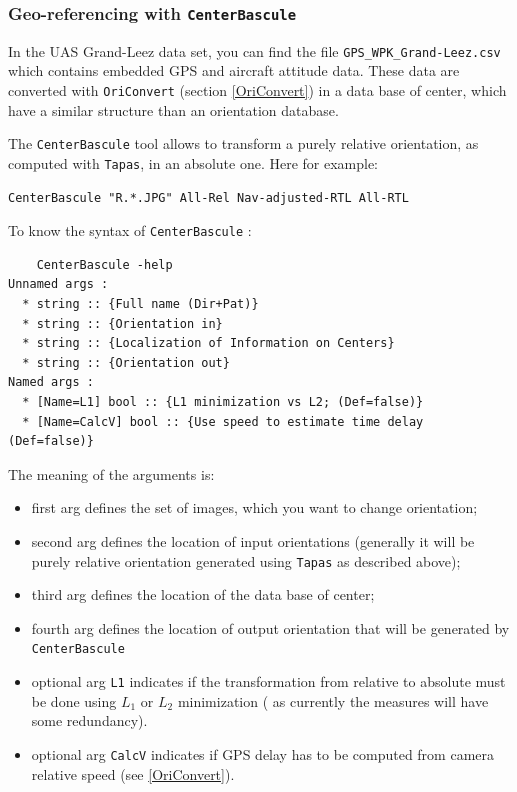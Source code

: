 

\subsubsection{Geo-referencing with {\tt CenterBascule}}\label{Sec:CenterBascule}


In the UAS Grand-Leez data set, you can find the file {\tt GPS\_WPK\_Grand-Leez.csv} which contains embedded GPS and aircraft attitude data. These data are converted with {\tt OriConvert} (section \ref{OriConvert}) in a data base of center, which have a similar structure than an orientation database.

The {\tt CenterBascule} tool allows to transform a purely relative orientation,
as computed with {\tt Tapas}, in an absolute one. Here for example:

\begin{verbatim}
CenterBascule "R.*.JPG" All-Rel Nav-adjusted-RTL All-RTL
\end{verbatim}

To know the syntax of {\tt CenterBascule} :
\begin{verbatim}
	CenterBascule -help
Unnamed args :
  * string :: {Full name (Dir+Pat)}
  * string :: {Orientation in}
  * string :: {Localization of Information on Centers}
  * string :: {Orientation out}
Named args :
  * [Name=L1] bool :: {L1 minimization vs L2; (Def=false)}
  * [Name=CalcV] bool :: {Use speed to estimate time delay (Def=false)}
\end{verbatim}

The meaning of the arguments is:

\begin{itemize}
  \item  first arg defines the set of images, which you want to change orientation;
  \item  second arg defines the location of input orientations (generally it will be purely relative
	 orientation generated using {\tt Tapas} as described above);
  \item third arg defines the location of the data base of center;
  \item fourth arg defines the location of output orientation that will be generated by {\tt CenterBascule}
  \item optional arg {\tt L1} indicates if the transformation from relative to absolute
	 must be done using $L_1$ or $L_2$ minimization ( as currently the  measures
	 will have some redundancy).
	\item optional arg {\tt CalcV} indicates if GPS delay has to be computed from camera relative speed (see \ref{OriConvert}).
\end{itemize}

